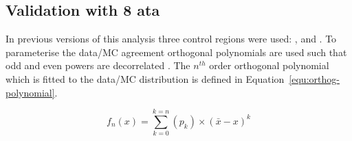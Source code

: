\subsection{Validation with 8 \texorpdfstring{\TeV} Data}
\label{sec:valid8}
In previous versions of this analysis three control regions
were used: \mj, \mmj and \gj. To parameterise the data/MC agreement
orthogonal polynomials are used such that odd and even powers 
are decorrelated \cite{cohen2013applied}. 
The $n^{th}$ order orthogonal polynomial which is fitted to the data/MC 
distribution is defined in Equation~\ref{equ:orthog-polynomial}.

\begin{equation}
  \label{equ:orthog-polynomial}
  f_n(x) = \sum_{k=0}^{k=n}{(p_k)\times(\bar{x}-x)^k}
\end{equation}

